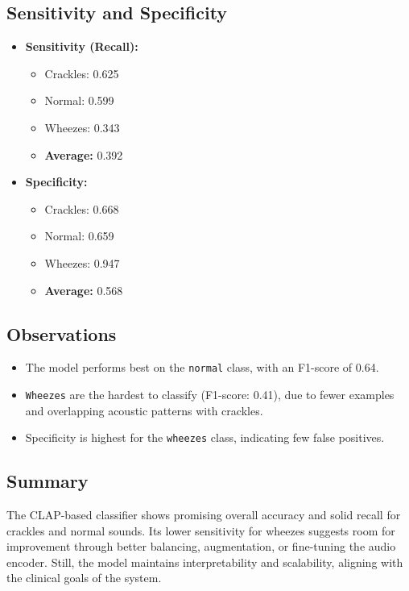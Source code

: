 \subsection{Sensitivity and Specificity}
\begin{itemize}
    \item \textbf{Sensitivity (Recall):}
    \begin{itemize}
        \item Crackles: 0.625
        \item Normal: 0.599
        \item Wheezes: 0.343
        \item \textbf{Average:} 0.392
    \end{itemize}
    
    \item \textbf{Specificity:}
    \begin{itemize}
        \item Crackles: 0.668
        \item Normal: 0.659
        \item Wheezes: 0.947
        \item \textbf{Average:} 0.568
    \end{itemize}
\end{itemize}

\subsection{Observations}
\begin{itemize}
    \item The model performs best on the \texttt{normal} class, with an F1-score of 0.64.
    \item \texttt{Wheezes} are the hardest to classify (F1-score: 0.41), due to fewer examples and overlapping acoustic patterns with crackles.
    \item Specificity is highest for the \texttt{wheezes} class, indicating few false positives.
\end{itemize}

\subsection*{Summary}
The CLAP-based classifier shows promising overall accuracy and solid recall for crackles and normal sounds. Its lower sensitivity for wheezes suggests room for improvement through better balancing, augmentation, or fine-tuning the audio encoder. Still, the model maintains interpretability and scalability, aligning with the clinical goals of the system.
